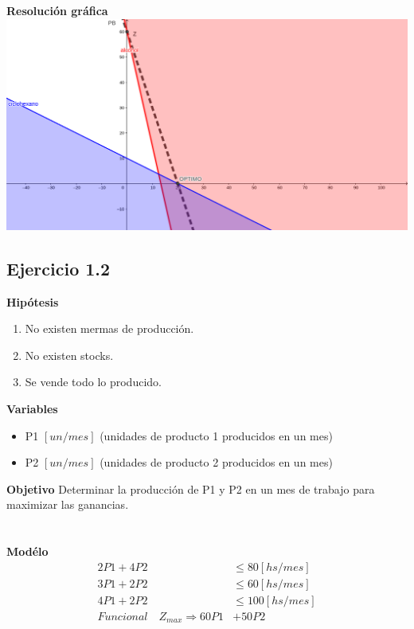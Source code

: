 \documentclass[12pt]{book}
\begin{document}
\begin{center}
\textbf{Resoluci\'on gr\'afica}
\includegraphics[scale=.1]{./img/1-1.png}
\end{center}


\subsection{Ejercicio 1.2}
\textbf{Hipótesis}
\begin{enumerate} 
\item No existen mermas de producción.
\item No existen stocks.
\item Se vende todo lo producido.
\end{enumerate}

\textbf{Variables}
\begin{itemize}
\item P1 $[un/mes]$ (unidades de producto 1 producidos en un mes)
\item P2 $[un/mes]$ (unidades de producto 2 producidos en un mes)
\end{itemize}

\textbf{Objetivo}
Determinar la producción de P1 y P2 en un mes de trabajo para maximizar las ganancias.
\\ \\ \\
\textbf{Modélo}
\begin{align*}
2 P1 + 4 P2 &\leq 80 [hs/mes] \\
3 P1 + 2 P2 &\leq 60 [hs/mes] \\
4 P1 + 2 P2 &\leq 100 [hs/mes] \\
Funcional \quad Z_{max} \Rightarrow  60 P1 &+ 50 P2 
\end{align*}
\end{document}
